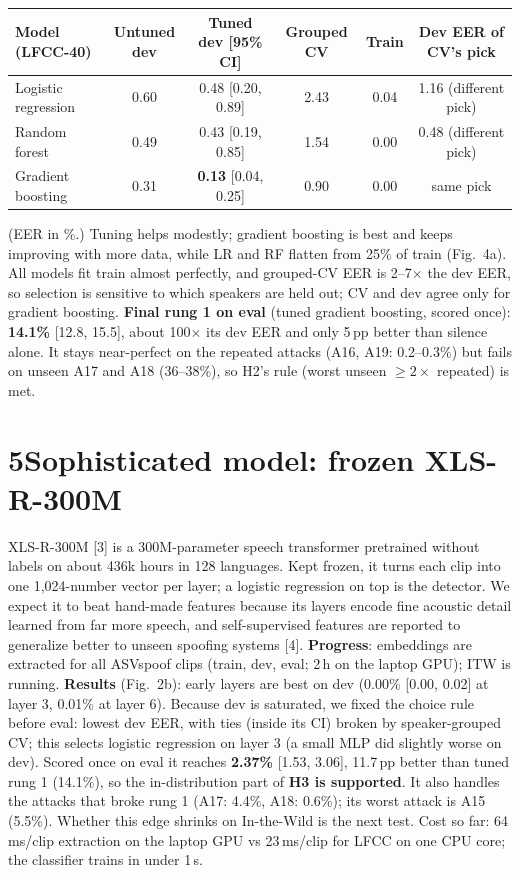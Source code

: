 \documentclass[10pt]{article}
\newcommand{\pp}{\,pp}
\begin{document}
\begin{center}\small
\begin{tabular}{lccccc}
\toprule
Model (LFCC-40) & Untuned dev & Tuned dev [95\% CI] & Grouped CV & Train & Dev EER of CV's pick \\
\midrule
Logistic regression & 0.60 & 0.48 [0.20, 0.89] & 2.43 & 0.04 & 1.16 (different pick) \\
Random forest & 0.49 & 0.43 [0.19, 0.85] & 1.54 & 0.00 & 0.48 (different pick) \\
Gradient boosting & 0.31 & \textbf{0.13} [0.04, 0.25] & 0.90 & 0.00 & same pick \\
\bottomrule
\end{tabular}
\end{center}
(EER in \%.) Tuning helps modestly; gradient boosting is best and keeps improving with more data,
while LR and RF flatten from 25\% of train (Fig.~4a). All models fit train almost perfectly, and
grouped-CV EER is 2--7$\times$ the dev EER, so selection is sensitive to which speakers are held out;
CV and dev agree only for gradient boosting. \textbf{Final rung 1 on eval} (tuned gradient boosting,
scored once): \textbf{14.1\%} [12.8, 15.5], about 100$\times$ its dev EER and only 5\pp{} better than
silence alone. It stays near-perfect on the repeated attacks (A16, A19: 0.2--0.3\%) but fails on unseen
A17 and A18 (36--38\%), so H2's rule (worst unseen $\geq 2\times$ repeated) is met.

\section*{5\quad Sophisticated model: frozen XLS-R-300M}
XLS-R-300M [3] is a 300M-parameter speech transformer pretrained without labels on about 436k hours in
128 languages. Kept frozen, it turns each clip into one 1,024-number vector per layer; a logistic
regression on top is the detector. We expect it to beat hand-made features because its layers encode
fine acoustic detail learned from far more speech, and self-supervised features are reported to
generalize better to unseen spoofing systems [4]. \textbf{Progress}: embeddings are extracted for all
ASVspoof clips (train, dev, eval; 2\,h on the laptop GPU); ITW is running. \textbf{Results} (Fig.~2b): early layers are best on dev
(0.00\% [0.00, 0.02] at layer 3, 0.01\% at layer 6). Because dev is saturated, we fixed the choice rule
before eval: lowest dev EER, with ties (inside its CI) broken by speaker-grouped CV; this selects
logistic regression on layer 3 (a small MLP did slightly worse on dev). Scored once on eval it reaches
\textbf{2.37\%} [1.53, 3.06], 11.7\pp{} better than tuned rung 1 (14.1\%), so the in-distribution part
of \textbf{H3 is supported}. It also handles the attacks that broke rung 1 (A17: 4.4\%, A18: 0.6\%);
its worst attack is A15 (5.5\%). Whether this edge shrinks on In-the-Wild is the next test. Cost so far: 64\,ms/clip extraction on the
laptop GPU vs 23\,ms/clip for LFCC on one CPU core; the classifier trains in under 1\,s.
\end{document}
